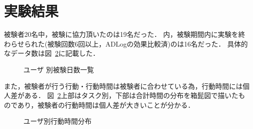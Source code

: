 \section{実験結果}
被験者20名中，被験に協力頂いたのは19名だった．
内，被験期間内に実験を終わらせられた(被験回数6回以上，ADLogの効果比較済)のは16名だった．
具体的なデータ数は図~\ref{fig:day}に記載した．
\begin{figure}[hb]
	\begin{center}
		\caption{ユーザ 別被験日数一覧}
		\label{fig:day}
	\end{center}
\end{figure}

また，被験者が行う行動・行動時間は被験者に合わせている為，行動時間には個人差がある．
図~\ref{fig:day}上部はタスク別，下部は合計時間の分布を箱髭図で描いたものであり，被験者の行動時間は個人差が大きいことが分かる．
\begin{figure}[hb]
	\begin{center}
		\caption{ユーザ別行動時間分布}
		\label{fig:day}
	\end{center}
\end{figure}

